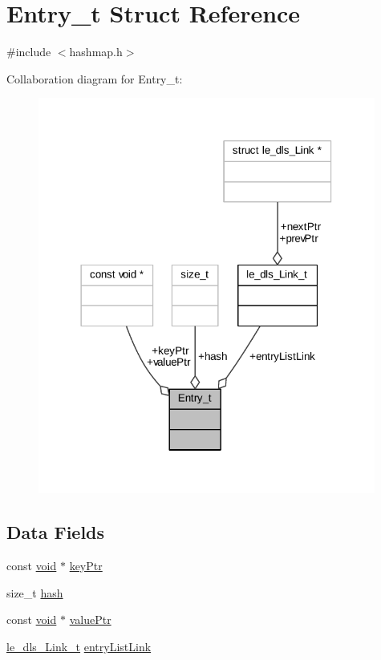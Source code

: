 \hypertarget{struct_entry}{}\section{Entry\+\_\+t Struct Reference}
\label{struct_entry}


{\ttfamily \#include $<$hashmap.\+h$>$}



Collaboration diagram for Entry\+\_\+t\+:
\nopagebreak
\begin{figure}[H]
\begin{center}
\leavevmode
\includegraphics[width=314pt]{struct_entry__coll__graph}
\end{center}
\end{figure}
\subsection*{Data Fields}
\begin{DoxyCompactItemize}
\item 
const \hyperlink{_t_e_m_p_l_a_t_e__cdef_8h_ac9c84fa68bbad002983e35ce3663c686}{void} $\ast$ \hyperlink{struct_entry_a078bf33837bab86d5120f7e3baa747d7}{key\+Ptr}
\item 
size\+\_\+t \hyperlink{struct_entry_a88a00783aa2afe2217b79af4e09a9b3b}{hash}
\item 
const \hyperlink{_t_e_m_p_l_a_t_e__cdef_8h_ac9c84fa68bbad002983e35ce3663c686}{void} $\ast$ \hyperlink{struct_entry_abbbe413e8daeb8c26fa2b0c74088604c}{value\+Ptr}
\item 
\hyperlink{structle__dls___link__t}{le\+\_\+dls\+\_\+\+Link\+\_\+t} \hyperlink{struct_entry_a5253e0b3c69ddb17f7dfdf7c6b16dc0f}{entry\+List\+Link}
\end{DoxyCompactItemize}


